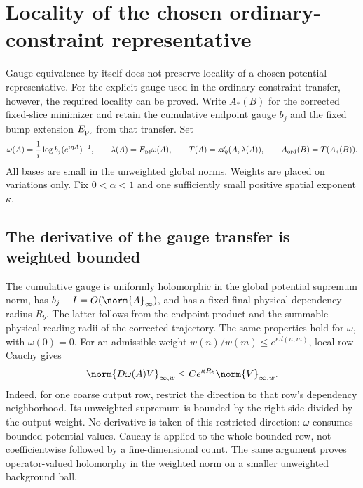 
\section{Locality of the chosen ordinary-constraint representative}
\label{or-section}

Gauge equivalence by itself does not preserve locality of a chosen
potential representative. For the explicit gauge used in the ordinary
constraint transfer, however, the required locality can be proved.
Write $A_*(B)$ for the corrected fixed-slice minimizer and retain the
cumulative endpoint gauge $b_j$ and the fixed bump extension
$E_{\rm pt}$ from that transfer. Set
\begin{equation}\label{or-transfer}
 \omega(A)=\frac1i\log b_j(e^{i\eta A})^{-1},\qquad
 \lambda(A)=E_{\rm pt}\omega(A),\qquad
 T(A)=\mathscr A_\eta(A,\lambda(A)),\qquad
 A_{\rm ord}(B)=T(A_*(B)).
\end{equation}
All bases are small in the unweighted global norms. Weights are
placed on variations only. Fix $0<\alpha<1$ and one sufficiently
small positive spatial exponent $\kappa$.

\subsection{The derivative of the gauge transfer is weighted bounded}

The cumulative gauge is uniformly holomorphic in the global
potential supremum norm, has $b_j-I=O(\norm{A}_\infty)$,
and has a fixed final physical dependency radius $R_b$.
The latter follows from the endpoint product and the summable
physical reading radii of the corrected trajectory.
The same properties hold for $\omega$, with $\omega(0)=0$.
For an admissible weight $w(n)/w(m)\le e^{\kappa d(n,m)}$,
local-row Cauchy gives
\begin{equation}\label{or-omega-derivative}
 \norm{D\omega(A)V}_{\infty,w}
      \le C e^{\kappa R_b}\norm{V}_{\infty,w}.
\end{equation}
Indeed, for one coarse output row, restrict the direction to that
row's dependency neighborhood. Its unweighted supremum is bounded
by the right side divided by the output weight. No derivative is
taken of this restricted direction: $\omega$ consumes bounded
potential values. Cauchy is applied to the whole bounded row,
not coefficientwise followed by a fine-dimensional count.
The same argument proves operator-valued holomorphy in the
weighted norm on a smaller unweighted background ball.

